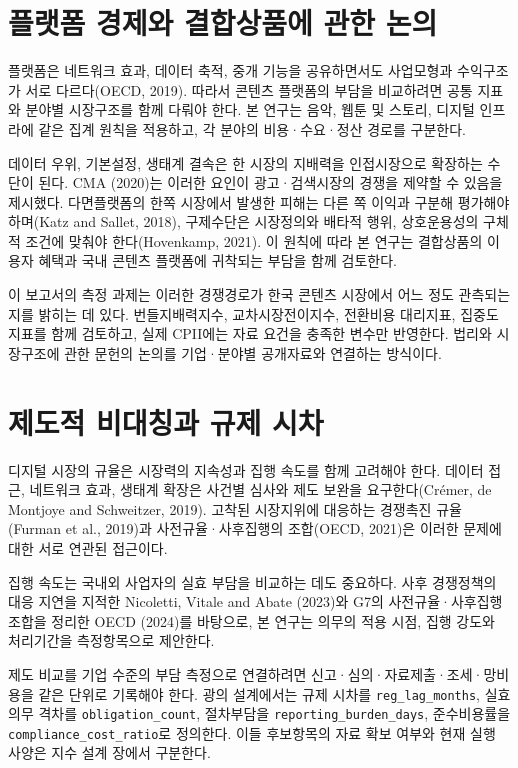\documentclass[11pt,a4paper]{report}
\begin{document}
\section{플랫폼 경제와 결합상품에 관한 논의}
플랫폼은 네트워크 효과, 데이터 축적, 중개 기능을 공유하면서도 사업모형과 수익구조가 서로 다르다(OECD, 2019). 따라서 콘텐츠 플랫폼의 부담을 비교하려면 공통 지표와 분야별 시장구조를 함께 다뤄야 한다. 본 연구는 음악, 웹툰 및 스토리, 디지털 인프라에 같은 집계 원칙을 적용하고, 각 분야의 비용·수요·정산 경로를 구분한다.

데이터 우위, 기본설정, 생태계 결속은 한 시장의 지배력을 인접시장으로 확장하는 수단이 된다. CMA (2020)는 이러한 요인이 광고·검색시장의 경쟁을 제약할 수 있음을 제시했다. 다면플랫폼의 한쪽 시장에서 발생한 피해는 다른 쪽 이익과 구분해 평가해야 하며(Katz and Sallet, 2018), 구제수단은 시장정의와 배타적 행위, 상호운용성의 구체적 조건에 맞춰야 한다(Hovenkamp, 2021). 이 원칙에 따라 본 연구는 결합상품의 이용자 혜택과 국내 콘텐츠 플랫폼에 귀착되는 부담을 함께 검토한다.

이 보고서의 측정 과제는 이러한 경쟁경로가 한국 콘텐츠 시장에서 어느 정도 관측되는지를 밝히는 데 있다. 번들지배력지수, 교차시장전이지수, 전환비용 대리지표, 집중도 지표를 함께 검토하고, 실제 CPII에는 자료 요건을 충족한 변수만 반영한다. 법리와 시장구조에 관한 문헌의 논의를 기업·분야별 공개자료와 연결하는 방식이다.

\section{제도적 비대칭과 규제 시차}
디지털 시장의 규율은 시장력의 지속성과 집행 속도를 함께 고려해야 한다. 데이터 접근, 네트워크 효과, 생태계 확장은 사건별 심사와 제도 보완을 요구한다(Cr\'emer, de Montjoye and Schweitzer, 2019). 고착된 시장지위에 대응하는 경쟁촉진 규율(Furman et al., 2019)과 사전규율·사후집행의 조합(OECD, 2021)은 이러한 문제에 대한 서로 연관된 접근이다.

집행 속도는 국내외 사업자의 실효 부담을 비교하는 데도 중요하다. 사후 경쟁정책의 대응 지연을 지적한 Nicoletti, Vitale and Abate (2023)와 G7의 사전규율·사후집행 조합을 정리한 OECD (2024)를 바탕으로, 본 연구는 의무의 적용 시점, 집행 강도와 처리기간을 측정항목으로 제안한다.

제도 비교를 기업 수준의 부담 측정으로 연결하려면 신고·심의·자료제출·조세·망비용을 같은 단위로 기록해야 한다. 광의 설계에서는 규제 시차를 \nolinkurl{reg_lag_months}, 실효의무 격차를 \nolinkurl{obligation_count}, 절차부담을 \nolinkurl{reporting_burden_days}, 준수비용률을 \nolinkurl{compliance_cost_ratio}로 정의한다. 이들 후보항목의 자료 확보 여부와 현재 실행 사양은 지수 설계 장에서 구분한다.
\end{document}
